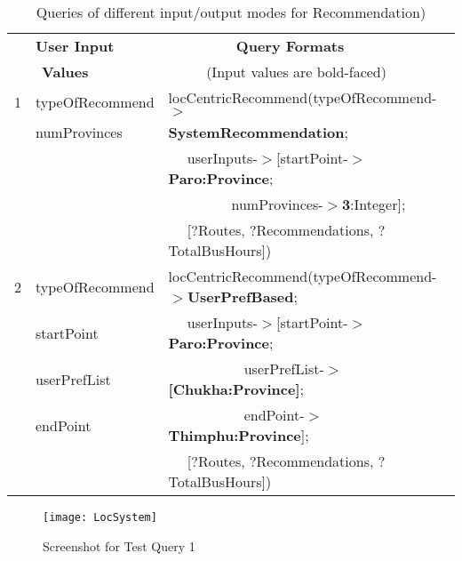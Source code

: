 \begin{table} [tbph]
\caption{Queries of different input/output modes for Recommendation)}
\centering
\footnotesize
\begin{tabular}{|l|l|l|}
\hline
 &\textbf{User Input} &$~~~~~~~~~~~~~~~~~~~~$ \textbf{Query Formats} \\
 &$~~$\textbf{Values}   &$~~~~~~~~~~~~$(Input values are bold-faced)          \\
\hline
  1&typeOfRecommend & locCentricRecommend(typeOfRecommend-$>$\\
     &numProvinces        &$~~~~~~~~~~~~~~~~~~~~~~~~~~~~~~~~~$\textbf{SystemRecommendation};\\
     & &$~~~~~~$userInputs-$>$[startPoint-$>$\textbf{Paro:Province}; \\
     & &$~~~~~~~~~~~~~~~~~~~~$numProvinces-$>$\textbf{3}:Integer]; \\
         &                       &$~~~~~~$[$?$Routes, $?$Recommendations, $?$TotalBusHours]) \\          
\hline
 2&typeOfRecommend & locCentricRecommend(typeOfRecommend-$>$\textbf{UserPrefBased};\\
  &startPoint       &$~~~~~~$userInputs-$>$[startPoint-$>$\textbf{Paro:Province}; \\
  &userPrefList     &$~~~~~~~~~~~~~~~~~~~~~~~~$userPrefList-$>$\textbf{[Chukha:Province]};\\
  &endPoint         &$~~~~~~~~~~~~~~~~~~~~~~~~$endPoint-$>$\textbf{Thimphu:Province}]; \\
  &                       &$~~~~~~$[$?$Routes, $?$Recommendations, $?$TotalBusHours]) \\  
\hline      
\end{tabular} 
\end{table}

\begin{figure}
\begin{center}
\texttt{[image: LocSystem]}
\caption {Screenshot for Test Query 1}
\label{fig:Fig6.4}
\end{center}
\end{figure}         


